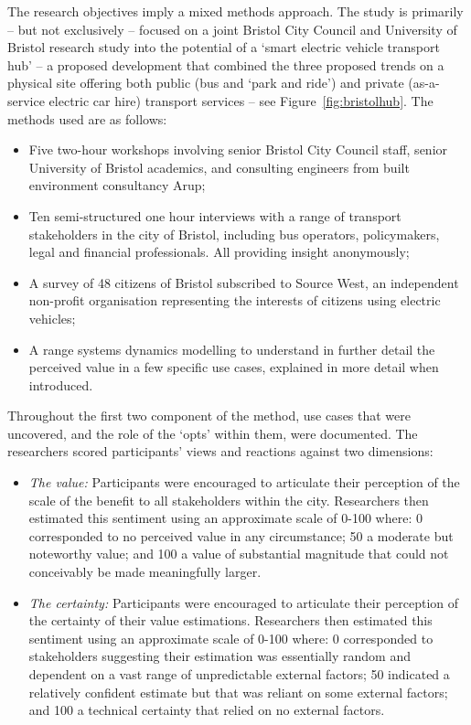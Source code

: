 \documentclass[b5paper,10pt]{article}
\begin{document}
The research objectives imply a mixed methods approach. The study is
primarily -- but not exclusively -- focused on a joint Bristol City
Council and University of Bristol research study into the potential of
a `smart electric vehicle transport hub' -- a proposed development
that combined the three proposed trends on a physical site offering
both public (bus and `park and ride') and private (as-a-service
electric car hire) transport services -- see
Figure~\ref{fig:bristolhub}. The methods used are as follows:

\begin{itemize}
\item Five two-hour workshops involving senior Bristol City Council
staff, senior University of Bristol academics, and consulting
engineers from built environment consultancy Arup;
\item Ten semi-structured one hour interviews with a range of
transport stakeholders in the city of Bristol, including bus
operators, policymakers, legal and financial professionals. All
providing insight anonymously;
\item A survey of 48 citizens of Bristol subscribed to Source West, an
independent non-profit organisation representing the interests of
citizens using electric vehicles;
\item A range systems dynamics modelling to understand in further
detail the perceived value in a few specific use cases, explained in
more detail when introduced.
\end{itemize}

Throughout the first two component of the method, use cases that were
uncovered, and the role of the `opts' within them, were
documented. The researchers scored participants' views and reactions
against two dimensions:

\begin{itemize}
\item {\emph{The value:}} Participants were encouraged to articulate their
perception of the scale of the benefit to all stakeholders within the
city. Researchers then estimated this sentiment using an approximate
scale of 0-100 where: 0 corresponded to no perceived value in any
circumstance; 50 a moderate but noteworthy value; and 100 a value of
substantial magnitude that could not conceivably be made meaningfully larger.
\item {\emph{The certainty:}} Participants were encouraged to articulate
their perception of the certainty of their value estimations. Researchers then
estimated this sentiment using an approximate scale of 0-100 where: 0
corresponded to stakeholders suggesting their estimation was
essentially random and dependent on a vast range of unpredictable
external factors; 50 indicated a relatively confident estimate but that was
reliant on some external factors; and 100 a technical certainty that
relied on no external factors.
\end{itemize}
\end{document}
